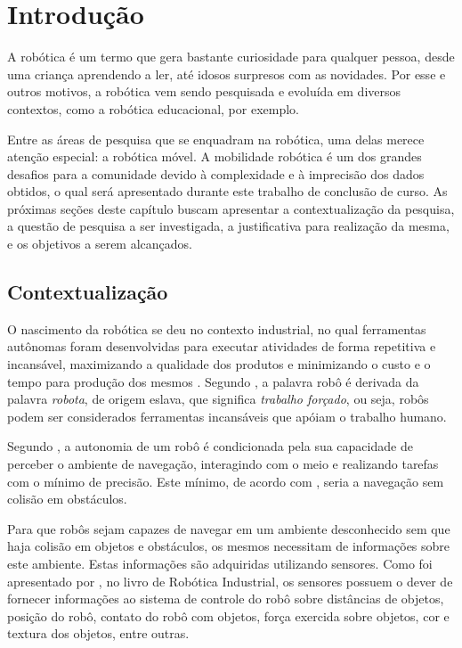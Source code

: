 \chapter[Introdução]{Introdução}

	A robótica é um termo que gera bastante curiosidade para qualquer pessoa, desde uma criança aprendendo a ler, até idosos surpresos com as novidades. Por esse e outros motivos, a robótica vem sendo pesquisada e evoluída em diversos contextos, como a robótica educacional, por exemplo. 

	Entre as áreas de pesquisa que se enquadram na robótica, uma delas merece atenção especial: a robótica móvel. A mobilidade robótica é um dos grandes desafios para a comunidade devido à complexidade e à imprecisão dos dados obtidos, o qual será apresentado durante este trabalho de conclusão de curso. As próximas seções deste capítulo buscam apresentar a contextualização da pesquisa, a questão de pesquisa a ser investigada, a justificativa para realização da mesma, e os objetivos a serem alcançados. 

\section{Contextualização}
	
	O nascimento da robótica se deu no contexto industrial, no qual ferramentas autônomas foram desenvolvidas para executar atividades de forma repetitiva e incansável, maximizando a qualidade dos produtos e minimizando o custo e o tempo para produção dos mesmos \cite{roboticaIndustrial}. Segundo \cite{roboticaIndustrial}, a palavra robô é derivada da palavra \textit{robota}, de origem eslava, que significa \textit{trabalho forçado}, ou seja, robôs podem ser considerados ferramentas incansáveis que apóiam o trabalho humano. 

	Segundo \cite{localizacaoEMapeamentoPaulo}, a autonomia de um robô é condicionada pela sua capacidade de perceber o ambiente de navegação, interagindo com o meio e realizando tarefas com o mínimo de precisão. Este mínimo, de acordo com \cite{localizacaoEMapeamentoPaulo}, seria a navegação sem colisão em obstáculos.

	Para que robôs sejam capazes de navegar em um ambiente desconhecido sem que haja colisão em objetos e obstáculos, os mesmos necessitam de informações sobre este ambiente. Estas informações são adquiridas utilizando sensores. Como foi apresentado por \cite{interacaoRoboAmbiente}, no livro de Robótica Industrial, os sensores possuem o dever de fornecer informações ao sistema de controle do robô sobre distâncias de objetos, posição do robô, contato do robô com objetos, força exercida sobre objetos, cor e textura dos objetos, entre outras.

